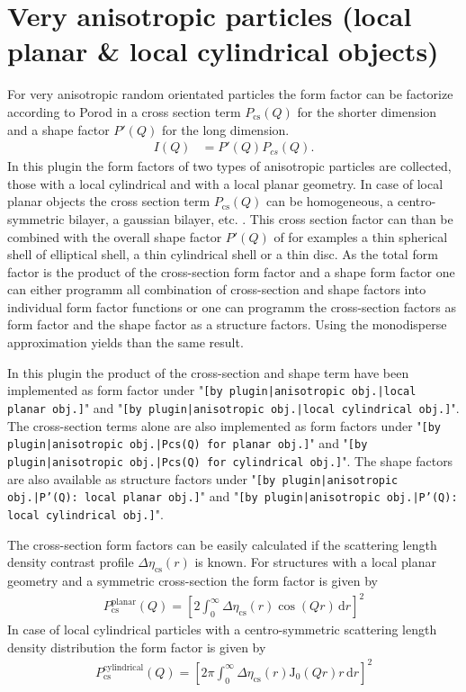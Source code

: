 \section{Very anisotropic particles (local planar \& local cylindrical objects)}
\label{sec:very_anisotropic_particles}
For very anisotropic random orientated particles the form factor
can be factorize according to Porod \cite{Porod1948} in a cross
section term $P_\text{cs}(Q)$ for the shorter dimension and a
shape factor $P'(Q)$ for the long dimension.
\begin{align}
I(Q) &=P'(Q) P_{cs}(Q).
\end{align}
In this plugin the form factors of two types of anisotropic
particles are collected, those with a local cylindrical and with a
local planar geometry. In case of local planar objects the cross
section term $P_\text{cs}(Q)$ can be homogeneous, a
centro-symmetric bilayer, a gaussian bilayer, etc. . This cross
section factor can than be combined with the overall shape factor
$P'(Q)$ of for examples a thin spherical shell of elliptical
shell, a thin cylindrical shell or a thin disc. As the total form
factor is the product of the cross-section form factor and a shape
form factor one can either programm all combination of
cross-section and shape factors into individual form factor
functions or one can programm the cross-section factors as form
factor and the shape factor as a structure factors. Using the
monodisperse approximation yields than the same result.

In this plugin the product of the cross-section and shape term
have been implemented as form factor under "\texttt{[by
plugin|anisotropic obj.|local planar obj.]}" and "\texttt{[by
plugin|anisotropic obj.|local cylindrical obj.]}". The
cross-section terms alone are also implemented as form factors
under "\texttt{[by plugin|anisotropic obj.|Pcs(Q) for planar obj.]}"
and "\texttt{[by plugin|anisotropic obj.|Pcs(Q) for cylindrical
obj.]}". The shape factors are also available as structure factors
under "\texttt{[by plugin|anisotropic obj.|P'(Q): local planar
obj.]}" and "\texttt{[by plugin|anisotropic obj.|P'(Q): local
cylindrical obj.]}".

The cross-section form factors can be easily calculated if the
scattering length density contrast profile
$\Delta\eta_\textrm{cs}(r)$ is known. For structures with a local
planar geometry and a symmetric cross-section the form factor is
given by
\begin{align}
P_\textrm{cs}^\textrm{planar} (Q) = \left[2\int_0^\infty
\Delta\eta_\textrm{cs}(r) \cos(Qr) \, \textrm{d}r\right]^2
\label{Pcs:planar}
\end{align}
In case of local cylindrical particles with a centro-symmetric
scattering length density distribution the form factor is given by
\begin{align}
P_\textrm{cs}^\textrm{cylindrical} (Q) = \left[2\pi\int_0^\infty
\Delta\eta_\textrm{cs}(r) \textrm{J}_0(Qr)r \,
\textrm{d}r\right]^2 \label{Pcs:cylindrical}
\end{align}

